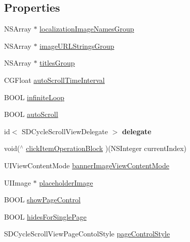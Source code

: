 \subsection*{Properties}
\begin{DoxyCompactItemize}
\item 
N\+S\+Array $\ast$ \mbox{\hyperlink{interface_s_d_cycle_scroll_view_a1d6090993c8d5c86a548144ab8355aff}{localization\+Image\+Names\+Group}}
\item 
N\+S\+Array $\ast$ \mbox{\hyperlink{interface_s_d_cycle_scroll_view_aa00dbc1e77d6613980a162d77c0a3708}{image\+U\+R\+L\+Strings\+Group}}
\item 
N\+S\+Array $\ast$ \mbox{\hyperlink{interface_s_d_cycle_scroll_view_a823f7f01321b7bed8e297e7a47b0f228}{titles\+Group}}
\item 
C\+G\+Float \mbox{\hyperlink{interface_s_d_cycle_scroll_view_a2d66927f0b94893660eb67f92445b3ec}{auto\+Scroll\+Time\+Interval}}
\item 
B\+O\+OL \mbox{\hyperlink{interface_s_d_cycle_scroll_view_a3623218b9fb158e7a424366b4aebd11b}{infinite\+Loop}}
\item 
B\+O\+OL \mbox{\hyperlink{interface_s_d_cycle_scroll_view_a4f1a5064309cd90c10e9ea62def66c0a}{auto\+Scroll}}
\item 
\mbox{\label{interface_s_d_cycle_scroll_view_adef7eb5c5c35ad690d24d99172940546}} 
id$<$ S\+D\+Cycle\+Scroll\+View\+Delegate $>$ {\bfseries delegate}
\item 
void($^\wedge$ \mbox{\hyperlink{interface_s_d_cycle_scroll_view_a98ee7c5b56beb4422bc213a92f641ed6}{click\+Item\+Operation\+Block}} )(N\+S\+Integer current\+Index)
\item 
U\+I\+View\+Content\+Mode \mbox{\hyperlink{interface_s_d_cycle_scroll_view_a35c6137625c07b2065814535c01e342e}{banner\+Image\+View\+Content\+Mode}}
\item 
U\+I\+Image $\ast$ \mbox{\hyperlink{interface_s_d_cycle_scroll_view_a60014e43c9aa95a4b615ce4cb88a6a8f}{placeholder\+Image}}
\item 
B\+O\+OL \mbox{\hyperlink{interface_s_d_cycle_scroll_view_a176281c165e4b04691fe8b8bc79ea17d}{show\+Page\+Control}}
\item 
B\+O\+OL \mbox{\hyperlink{interface_s_d_cycle_scroll_view_afda57a05cf1b3a09a93a4c4a6975c59c}{hides\+For\+Single\+Page}}
\item 
S\+D\+Cycle\+Scroll\+View\+Page\+Contol\+Style \mbox{\hyperlink{interface_s_d_cycle_scroll_view_ab427f3ffce0dc0ec3558877e4a0538f7}{page\+Control\+Style}}

\end{DoxyCompactItemize}
